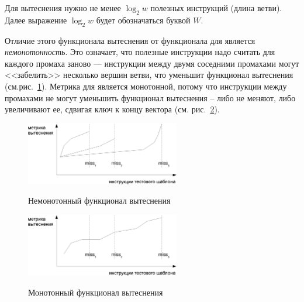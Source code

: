 Для вытеснения нужно не менее $\log_2 w$ полезных инструкций (длина ветви).
Далее выражение $\log_2 w$ будет обозначаться буквой $W$.

Отличие этого функционала вытеснения от функционала для \LRU является \emph{немонотонность}. Это означает, что полезные инструкции надо считать для каждого промаха заново ---
инструкции между двумя соседними промахами могут <<забелить>>
несколько вершин ветви, что уменьшит функционал вытеснения
(см.рис.~\ref{nonmonotonic}). Метрика для \LRU является монотонной,
потому что инструкции между промахами не могут уменьшить функционал вытеснения -- либо не меняют, либо увеличивают ее, сдвигая ключ к концу вектора \LRU (см. рис.~\ref{monotonic}).


\begin{figure}[h] \center
  \includegraphics[width=0.6\textwidth]{2.theor/nonmonotonic}\\
  \caption{Немонотонный функционал вытеснения}\label{nonmonotonic}
\end{figure}

\begin{figure}[h] \center
  \includegraphics[width=0.6\textwidth]{2.theor/monotonic}\\
  \caption{Монотонный функционал вытеснения}\label{monotonic}
\end{figure}

